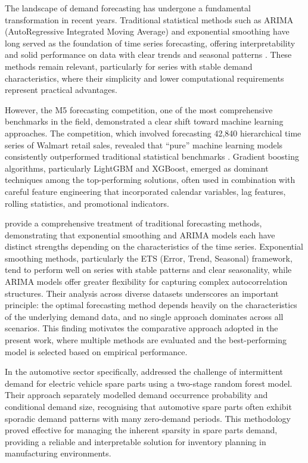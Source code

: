\documentclass[ENG]{TFUOC}%
\begin{document}
The landscape of demand forecasting has undergone a fundamental transformation in recent years. Traditional statistical methods such as ARIMA (AutoRegressive Integrated Moving Average) and exponential smoothing have long served as the foundation of time series forecasting, offering interpretability and solid performance on data with clear trends and seasonal patterns \citep{makridakis2021m5}. These methods remain relevant, particularly for series with stable demand characteristics, where their simplicity and lower computational requirements represent practical advantages.

However, the M5 forecasting competition, one of the most comprehensive benchmarks in the field, demonstrated a clear shift toward machine learning approaches. The competition, which involved forecasting 42,840 hierarchical time series of Walmart retail sales, revealed that ``pure'' machine learning models consistently outperformed traditional statistical benchmarks \citep{makridakis2021m5findings}. Gradient boosting algorithms, particularly LightGBM and XGBoost, emerged as dominant techniques among the top-performing solutions, often used in combination with careful feature engineering that incorporated calendar variables, lag features, rolling statistics, and promotional indicators.

\citet{hyndman2021forecasting} provide a comprehensive treatment of traditional forecasting methods, demonstrating that exponential smoothing and ARIMA models each have distinct strengths depending on the characteristics of the time series. Exponential smoothing methods, particularly the ETS (Error, Trend, Seasonal) framework, tend to perform well on series with stable patterns and clear seasonality, while ARIMA models offer greater flexibility for capturing complex autocorrelation structures. Their analysis across diverse datasets underscores an important principle: the optimal forecasting method depends heavily on the characteristics of the underlying demand data, and no single approach dominates across all scenarios. This finding motivates the comparative approach adopted in the present work, where multiple methods are evaluated and the best-performing model is selected based on empirical performance.

In the automotive sector specifically, \citet{fu2026treebased} addressed the challenge of intermittent demand for electric vehicle spare parts using a two-stage random forest model. Their approach separately modelled demand occurrence probability and conditional demand size, recognising that automotive spare parts often exhibit sporadic demand patterns with many zero-demand periods. This methodology proved effective for managing the inherent sparsity in spare parts demand, providing a reliable and interpretable solution for inventory planning in manufacturing environments.
\end{document}
